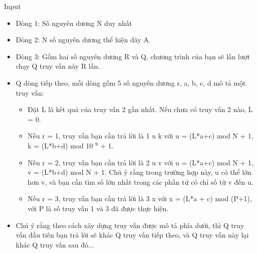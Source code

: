 Input
\begin{itemize}
	\item Dòng 1: Số nguyên dương N duy nhất
	\item Dòng 2: N số nguyên dương thể hiện dãy A.
	\item Dòng 3: Gồm hai số nguyên dương R và Q, chương trình của bạn sẽ lần lượt chạy Q truy vấn này R lần.
	\item Q dòng tiếp theo, mỗi dòng gồm 5 số nguyên dương r, a, b, c, d mô tả một truy vấn:
\begin{itemize}
	\item Đặt L là kết quả của truy vấn 2 gần nhất. Nếu chưa có truy vấn 2 nào, L = 0.
	\item Nếu r = 1, truy vấn bạn cần trả lời là 1 u k với u = (L*a+c) mod N + 1, k = (L*b+d) mod 10 $^ 9 $ + 1.
	\item Nếu r = 2, truy vấn bạn cần trả lời là 2 u v với u = (L*a+c) mod N + 1, v = (L*b+d) mod N + 1. Chú ý rằng trong trường hợp này, u có thể lớn hơn v, và bạn cần tìm số lớn nhất trong các phần tử có chỉ số từ v đến u.
	\item Nếu r = 3, truy vấn bạn cần trả lời là 3 x với x = (L*a + c) mod (P+1), với P là số truy vấn 1 và 3 đã được thực hiện.
\end{itemize}
	\item Chú ý rằng theo cách xây dựng truy vấn được mô tả phía dưới, thì Q truy vấn đầu tiên bạn trả lời sẽ khác Q truy vấn tiếp theo, và Q truy vấn này lại khác Q truy vấn sau đó...
\begin{itemize}
\end{itemize}
\end{itemize}